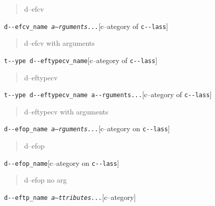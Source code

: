 \documentclass{book}
\begin{document}
%
\begin{quote}
\unskip{\parskip=0pt\noindent}%
d--efcv
\end{quote}

\noindent\texttt{d{-}{-}efcv\_name \EmbracOn{}\textnormal{\textsl{a--rguments...}}\EmbracOff{}}\hfill[c--ategory of \texttt{c{-}{-}lass}]



%
\begin{quote}
\unskip{\parskip=0pt\noindent}%
d--efcv with arguments
\end{quote}

\noindent\texttt{t{-}{-}ype d{-}{-}eftypecv\_name}\hfill[c--ategory of \texttt{c{-}{-}lass}]



%
\begin{quote}
\unskip{\parskip=0pt\noindent}%
d--eftypecv
\end{quote}

\noindent\texttt{t{-}{-}ype d{-}{-}eftypecv\_name a{-}{-}rguments...}\hfill[c--ategory of \texttt{c{-}{-}lass}]



%
\begin{quote}
\unskip{\parskip=0pt\noindent}%
d--eftypecv with arguments
\end{quote}

\noindent\texttt{d{-}{-}efop\_name \EmbracOn{}\textnormal{\textsl{a--rguments...}}\EmbracOff{}}\hfill[c--ategory on \texttt{c{-}{-}lass}]



%
\begin{quote}
\unskip{\parskip=0pt\noindent}%
d--efop
\end{quote}

\noindent\texttt{d{-}{-}efop\_name}\hfill[c--ategory on \texttt{c{-}{-}lass}]



%
\begin{quote}
\unskip{\parskip=0pt\noindent}%
d--efop no arg
\end{quote}

\noindent\texttt{d{-}{-}eftp\_name \EmbracOn{}\textnormal{\textsl{a--ttributes...}}\EmbracOff{}}\hfill[c--ategory]
\end{document}
